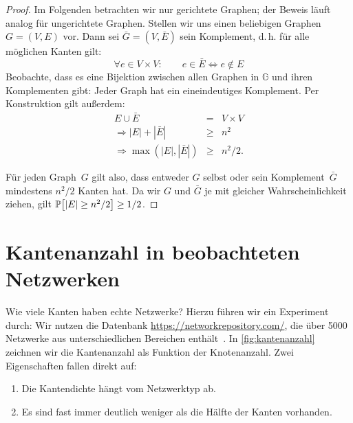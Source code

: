 \begin{proof}
    Im Folgenden betrachten wir nur gerichtete Graphen; der Beweis läuft analog für ungerichtete Graphen.
    Stellen wir uns einen beliebigen Graphen~$G = (V, E)$ vor.
    Dann sei $\bar G = (V, \bar E)$ sein Komplement, d.\,h. für alle möglichen Kanten gilt:
    \begin{equation}
        \forall e \in V\times V\colon \quad\quad e \in \bar E \Leftrightarrow e \notin E
    \end{equation}
    Beobachte, dass es eine Bijektion zwischen allen Graphen in $\mathbb G$ und ihren Komplementen gibt: Jeder Graph hat ein eineindeutiges Komplement.
    Per Konstruktion gilt außerdem:
    \begin{eqnarray}
        E \cup \bar E &=& V \times V\\
        \Rightarrow |E| + |\bar E| &\ge& n^2\\
        \Rightarrow \max(|E|, |\bar E|) &\ge& n^2 / 2.
    \end{eqnarray}

    Für jeden Graph~$G$ gilt also, dass entweder $G$ selbst oder sein Komplement~$\bar G$ mindestens $n^2 / 2$ Kanten hat.
    Da wir $G$ und $\bar G$ je mit gleicher Wahrscheinlichkeit ziehen, gilt $\mathbb{P}\!\left[|E| \ge n^2 / 2\right] \ge 1/2$.
\end{proof}

\section{Kantenanzahl in beobachteten Netzwerken}\label{sec:kanten-in-beobachteten-netzen}
Wie viele Kanten haben echte Netzwerke? Hierzu führen wir ein Experiment durch:
Wir nutzen die Datenbank \url{https://networkrepository.com/}, die über 5000 Netzwerke aus unterschiedlichen Bereichen enthält~\cite{networkrepository}.
In \cref{fig:kantenanzahl} zeichnen wir die Kantenanzahl als Funktion der Knotenanzahl.
Zwei Eigenschaften fallen direkt auf:
\begin{enumerate}
    \item Die Kantendichte hängt vom Netzwerktyp ab.
    \item Es sind fast immer deutlich weniger als die Hälfte der Kanten vorhanden.
\end{enumerate}

